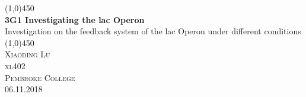 \documentclass{article}
\begin{document}
\begin{titlepage}
	\begin{center}
	\line(1,0){450}\\
	[0.25in]
	\huge{\bfseries 3G1 Investigating the lac Operon} \\
	[0.25in]
     \large Investigation on the feedback system of the lac Operon under different conditions\\
     \line(1,0){450} \\
	[12cm]
	\textsc{\Large Xiaoding Lu \\[1cm] xl402 \\ Pembroke College \\[1.2cm] 06.11.2018}\\
	\end{center}
	\begin{flushright}

	\begin{figure}[htp]
	\begin{flushright}
	\end{flushright}
	\end{figure}
	\end{flushright}

\vspace{2cm}

\end{titlepage}

\cleardoublepage
{}
\cleardoublepage
{}
\end{document}
